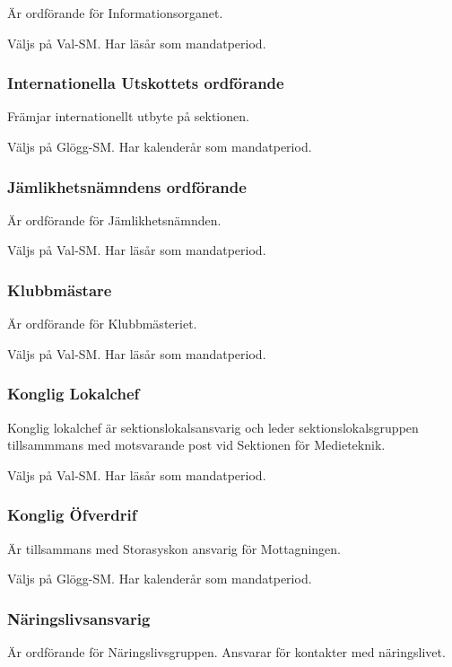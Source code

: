 \documentclass{dgovdoc}
\begin{document}
Är ordförande för Informationsorganet.

Väljs på Val-SM. Har läsår som mandatperiod.

\subsubsection{Internationella Utskottets ordförande}

Främjar internationellt utbyte på sektionen.

Väljs på Glögg-SM. Har kalenderår som mandatperiod.

\subsubsection{Jämlikhetsnämndens ordförande}

Är ordförande för Jämlikhetsnämnden.

Väljs på Val-SM. Har läsår som mandatperiod.

\subsubsection{Klubbmästare}

Är ordförande för Klubbmästeriet.

Väljs på Val-SM. Har läsår som mandatperiod.

\subsubsection{Konglig Lokalchef}

Konglig lokalchef är sektionslokalsansvarig och leder sektionslokalsgruppen
tillsammmans med motsvarande post vid Sektionen för Medieteknik.

Väljs på Val-SM. Har läsår som mandatperiod.

\subsubsection{Konglig Öfverdrif}

Är tillsammans med Storasyskon ansvarig för Mottagningen.

Väljs på Glögg-SM. Har kalenderår som mandatperiod.

\subsubsection{Näringslivsansvarig}

Är ordförande för Näringslivsgruppen. Ansvarar för kontakter med näringslivet.
\end{document}
